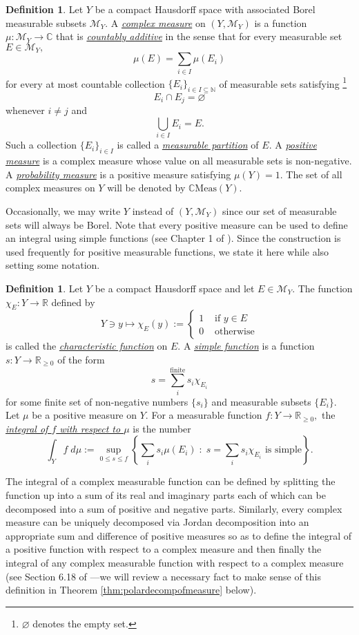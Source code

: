 \documentclass[12pt]{article}
\theoremstyle{theorem}
\theoremstyle{definition}
\newtheorem{definition}[equation]{Definition}
\numberwithin{equation}{section}
\let\C=\Chi \let\W=\Omega
\newcommand{\be}{\begin{equation}}
\newcommand{\ee}{\end{equation}}
\newcommand{\bd}{\begin{definition}}
\newcommand{\ed}{\end{definition}}
\newcommand{\<}{\langle}
\renewcommand{\>}{\rangle}
\def\R{{{\mathbb R}}}
\def\C{{{\mathbb C}}}
\def\N{{{\mathbb N}}}
\begin{document}
\bd
\label{defn:complexmeasure}
Let $Y$ be a compact Hausdorff space with associated Borel measurable
subsets $\mathcal{M}_{Y}.$ A \emph{\uline{complex measure}} on 
$(Y,\mathcal{M}_{Y})$ is a function $\mu:\mathcal{M}_{Y}\to\C$
that is \emph{\uline{countably additive}} in the sense that for 
every measurable set $E\in\mathcal{M}_{Y},$ 
\be
\mu(E)=\sum_{i\in I}\mu(E_{i})
\ee
for every at most countable collection
$\{E_{i}\}_{i\in I\subseteq\N}$ of measurable sets satisfying%
\footnote{$\varnothing$ denotes the empty set.}
\be
E_{i}\cap E_{j}=\varnothing
\ee
whenever $i\ne j$ and 
\be
\bigcup_{i\in I}E_{i}=E. 
\ee
Such a collection $\{E_{i}\}_{i\in I}$ is called a \emph{\uline{measurable partition}}
of $E.$ 
A \emph{\uline{positive measure}} is a complex measure whose
value on all measurable sets is non-negative. 
A \emph{\uline{probability measure}} is a positive measure
satisfying $\mu(Y)=1.$ The set of all complex measures on 
$Y$ will be denoted by $\C\mathrm{Meas}(Y).$ 
\ed

Occasionally, we may write $Y$ instead of $(Y,\mathcal{M}_{Y})$ since our set of
measurable sets will always be Borel. 
Note that every positive  
measure can be
used to define an integral using simple functions 
(see Chapter 1 of \cite{Ru87}).
Since the construction is used frequently for positive measurable functions, 
we state it here while also setting some notation. 
\bd
\label{defn:integral}
Let $Y$ be a compact Hausdorff space and let $E\in\mathcal{M}_{Y}.$ 
The function $\chi_{E}:Y\to\R$ defined by 
\be
Y\ni y\mapsto\chi_{E}(y):=\begin{cases}1&\mbox{ if } y\in E\\0&\mbox{ otherwise}\end{cases}
\ee
is called the \emph{\uline{characteristic function}} on $E.$ 
A \emph{\uline{simple function}} is a function $s:Y\to\R_{\ge0}$ of the form 
\be
s=\sum_{i}^{\text{finite}}s_{i}\chi_{E_{i}}
\ee
for some finite set of non-negative numbers $\{s_i\}$ 
and measurable subsets $\{E_{i}\}.$
Let $\mu$ be a positive measure on $Y.$ 
For a measurable function $f:Y\to\R_{\ge0},$ the 
\emph{\uline{integral of $f$ with respect to $\mu$}} is the number
\be
\int_{Y}f\;d\mu:=\sup_{0\le s\le f}\left\{\sum_{i}s_{i}\mu(E_{i})\;:\;s=\sum_{i}s_{i}\chi_{E_{i}}\text{ is simple}\right\}.
\ee
\ed
The integral of a complex measurable function can be defined by splitting the function
up into a sum of its real and imaginary parts each of which can be decomposed
into a sum of positive and negative parts. 
Similarly, every complex measure can be uniquely decomposed 
via Jordan decomposition into an appropriate sum and difference of 
positive measures so as to define the integral of a positive function 
with respect to a complex measure and then finally the integral
of any complex measurable function with respect to a complex
measure (see Section 6.18 of \cite{Ru87}---we will review a necessary
fact to make sense of this definition in Theorem 
\ref{thm:polardecompofmeasure} below). 
\end{document}
